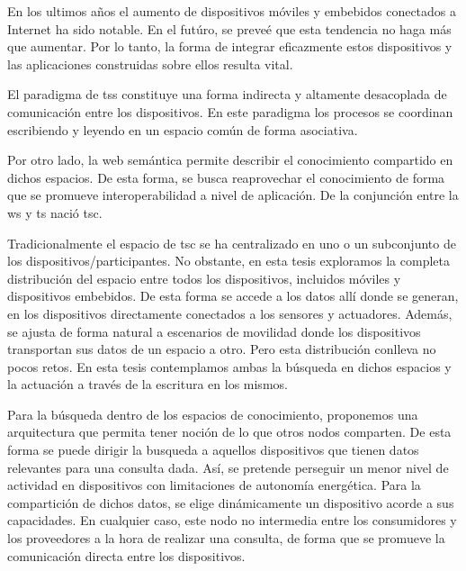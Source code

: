 \begin{resumen}        %

En los ultimos años el aumento de dispositivos móviles y embebidos conectados a Internet ha sido notable.
En el futúro, se preveé que esta tendencia no haga más que aumentar.
Por lo tanto, la forma de integrar eficazmente estos dispositivos y las aplicaciones construidas sobre ellos resulta vital.


El paradigma de \aclp{ts} constituye una forma indirecta y altamente desacoplada de comunicación entre los dispositivos.
En este paradigma los procesos se coordinan escribiendo y leyendo en un espacio común de forma asociativa.


Por otro lado, la web semántica permite describir el conocimiento compartido en dichos espacios.
De esta forma, se busca reaprovechar el conocimiento de forma que se promueve interoperabilidad a nivel de aplicación.
De la conjunción entre la \acf{ws} y \acf{ts} nació \ac{tsc}.


Tradicionalmente el espacio de \ac{tsc} se ha centralizado en uno o un subconjunto de los dispositivos/participantes.
No obstante, en esta tesis exploramos la completa distribución del espacio entre todos los dispositivos, incluidos móviles y dispositivos embebidos.
De esta forma se accede a los datos allí donde se generan, en los dispositivos directamente conectados a los sensores y actuadores.
Además, se ajusta de forma natural a escenarios de movilidad donde los dispositivos transportan sus datos de un espacio a otro.
Pero esta distribución conlleva no pocos retos.
En esta tesis contemplamos ambas la búsqueda en dichos espacios y la actuación a través de la escritura en los mismos.


Para la búsqueda dentro de los espacios de conocimiento, proponemos una arquitectura que permita tener noción de lo que otros nodos comparten.
De esta forma se puede dirigir la busqueda a aquellos dispositivos que tienen datos relevantes para una consulta dada.
Así, se pretende perseguir un menor nivel de actividad en dispositivos con limitaciones de autonomía energética.
Para la compartición de dichos datos, se elige dinámicamente un dispositivo acorde a sus capacidades.
En cualquier caso, este nodo no intermedia entre los consumidores y los proveedores a la hora de realizar una consulta, de forma que se promueve la comunicación directa entre los dispositivos.



\end{resumen}
